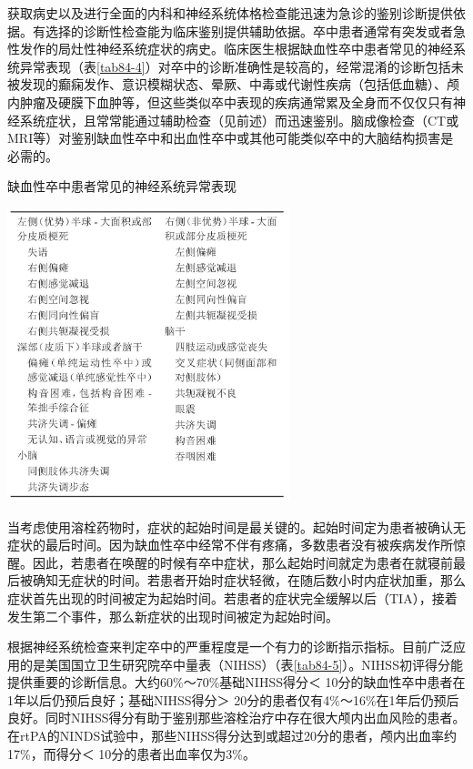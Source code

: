 获取病史以及进行全面的内科和神经系统体格检查能迅速为急诊的鉴别诊断提供依据。有选择的诊断性检查能为临床鉴别提供辅助依据。卒中患者通常有突发或者急性发作的局灶性神经系统症状的病史。临床医生根据缺血性卒中患者常见的神经系统异常表现（表\ref{tab84-4}）对卒中的诊断准确性是较高的，经常混淆的诊断包括未被发现的癫痫发作、意识模糊状态、晕厥、中毒或代谢性疾病（包括低血糖）、颅内肿瘤及硬膜下血肿等，但这些类似卒中表现的疾病通常累及全身而不仅仅只有神经系统症状，且常常能通过辅助检查（见前述）而迅速鉴别。脑成像检查（CT或MRI等）对鉴别缺血性卒中和出血性卒中或其他可能类似卒中的大脑结构损害是必需的。

\begin{table}[htbp]
\centering
\caption{缺血性卒中患者常见的神经系统异常表现}
\label{tab84-4}
\includegraphics[width=3.23958in,height=3.35417in]{./images/Image00373.jpg}
\end{table}

当考虑使用溶栓药物时，症状的起始时间是最关键的。起始时间定为患者被确认无症状的最后时间。因为缺血性卒中经常不伴有疼痛，多数患者没有被疾病发作所惊醒。因此，若患者在唤醒的时候有卒中症状，那么起始时间就定为患者在就寝前最后被确知无症状的时间。若患者开始时症状轻微，在随后数小时内症状加重，那么症状首先出现的时间被定为起始时间。若患者的症状完全缓解以后（TIA），接着发生第二个事件，那么新症状的出现时间被定为起始时间。

根据神经系统检查来判定卒中的严重程度是一个有力的诊断指示指标。目前广泛应用的是美国国立卫生研究院卒中量表（NIHSS）（表\ref{tab84-5}）。NIHSS初评得分能提供重要的诊断信息。大约60\%～70\%基础NIHSS得分＜
10分的缺血性卒中患者在1年以后仍预后良好；基础NIHSS得分＞
20分的患者仅有4\%～16\%在1年后仍预后良好。同时NIHSS得分有助于鉴别那些溶栓治疗中存在很大颅内出血风险的患者。在rtPA的NINDS试验中，那些NIHSS得分达到或超过20分的患者，颅内出血率约17\%，而得分＜
10分的患者出血率仅为3\%。

